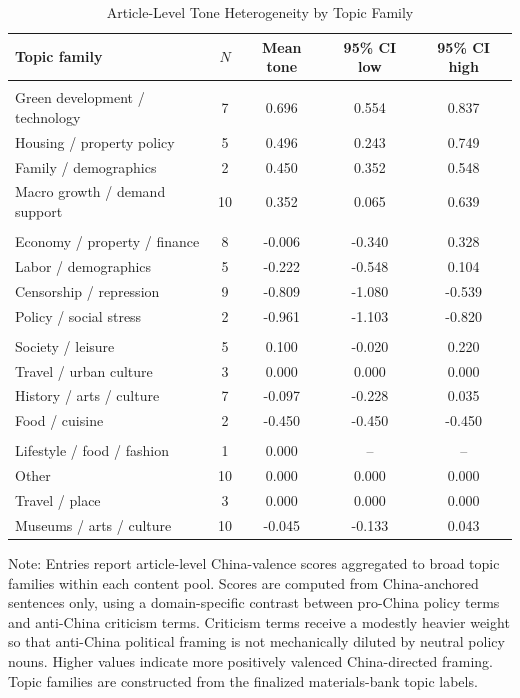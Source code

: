 \begin{table}[H]
\centering
\begin{threeparttable}
\caption{Article-Level Tone Heterogeneity by Topic Family}
\label{tab:topic_tone_heterogeneity}
\footnotesize
\begin{tabular}{lcccc}
\toprule
Topic family & $N$ & Mean tone & 95\% CI low & 95\% CI high\\
\midrule
\addlinespace[0.35em]
\multicolumn{5}{l}{\textit{Pro-China}}\\
Green development / technology & 7 & 0.696 & 0.554 & 0.837\\
Housing / property policy & 5 & 0.496 & 0.243 & 0.749\\
Family / demographics & 2 & 0.450 & 0.352 & 0.548\\
Macro growth / demand support & 10 & 0.352 & 0.065 & 0.639\\
\addlinespace[0.35em]
\multicolumn{5}{l}{\textit{Anti-China}}\\
Economy / property / finance & 8 & -0.006 & -0.340 & 0.328\\
Labor / demographics & 5 & -0.222 & -0.548 & 0.104\\
Censorship / repression & 9 & -0.809 & -1.080 & -0.539\\
Policy / social stress & 2 & -0.961 & -1.103 & -0.820\\
\addlinespace[0.35em]
\multicolumn{5}{l}{\textit{Apolitical China}}\\
Society / leisure & 5 & 0.100 & -0.020 & 0.220\\
Travel / urban culture & 3 & 0.000 & 0.000 & 0.000\\
History / arts / culture & 7 & -0.097 & -0.228 & 0.035\\
Food / cuisine & 2 & -0.450 & -0.450 & -0.450\\
\addlinespace[0.35em]
\multicolumn{5}{l}{\textit{Non-China control}}\\
Lifestyle / food / fashion & 1 & 0.000 & -- & --\\
Other & 10 & 0.000 & 0.000 & 0.000\\
Travel / place & 3 & 0.000 & 0.000 & 0.000\\
Museums / arts / culture & 10 & -0.045 & -0.133 & 0.043\\
\bottomrule
\end{tabular}
\begin{tablenotes}
\footnotesize
\item Note: Entries report article-level China-valence scores aggregated to broad topic families within each content pool. Scores are computed from China-anchored sentences only, using a domain-specific contrast between pro-China policy terms and anti-China criticism terms. Criticism terms receive a modestly heavier weight so that anti-China political framing is not mechanically diluted by neutral policy nouns. Higher values indicate more positively valenced China-directed framing. Topic families are constructed from the finalized materials-bank topic labels.
\end{tablenotes}
\end{threeparttable}
\end{table}
